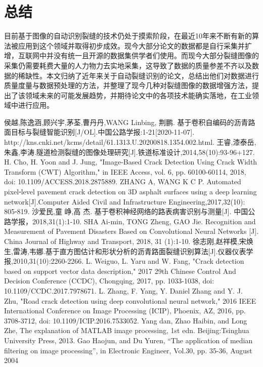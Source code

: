 \documentclass[a4paper,UTF8]{article}
\theoremstyle{definition}
\begin{document}
    \section{总结}
    目前基于图像的自动识别裂缝的技术仍处于摸索阶段，在最近10年来不断有新的算法被应用到这个领域并取得初步成效。现今大部分论文的数据都是自行采集并扩增，互联网中并没有统一且开源的数据集供学者们使用。而现今大部分裂缝图像的采集仍需要耗费大量的人力物力去实地采集，这导致了数据的质量参差不齐以及数据的稀缺性。本文归纳了近年来关于自动裂缝识别的论文，总结出他们对数据进行质量度量与数据预处理的方法，并整理了现今几种对裂缝图像的数据增强方法，提出了该领域未来的可能发展趋势，并期待论文中的各项技术能确实落地，在工业领域中进行应用。
	\begin{thebibliography}{99}
		 侯越,陈逸涵,顾兴宇,茅荃,曹丹丹,WANG Linbing, 荆鹏. 基于卷积自编码的沥青路面目标与裂缝智能识别[J/OL].中国公路学报:1-21[2020-11-07]. http://kns.cnki.net/kcms/detail/61.1313.U.20200818.1354.002.html.
		 王睿,漆泰岳,朱鑫,李涛.隧道检测裂缝的图像处理研究[J].铁道标准设计,2014,58(10):93-96+127.
		 H. Cho, H. Yoon and J. Jung, "Image-Based Crack Detection Using Crack Width Transform (CWT) Algorithm," in IEEE Access, vol. 6, pp. 60100-60114, 2018, doi: 10.1109/ACCESS.2018.2875889.
		 ZHANG A, WANG K C P. Automated pixel⁃level pavement crack detection on 3D asphalt surfaces using a deep learning network[J].Computer Aided Civil and Infrastructure Engineering,2017,32(10): 805⁃819.
		 沙爱民,童 峥,高 杰. 基于卷积神经网络的路表病害识别与测量[J]. 中国公路学报，2018,31(1):1-10. SHA Ai-min, TONG Zheng, GAO Jie. Recognition and Measurement of Pavement Disasters Based on Convolutional Neural Networks [J]. China Journal of Highway and Transport, 2018, 31 (1):1-10.
		 徐志刚,赵祥模,宋焕生,雷涛,韦娜.基于直方图估计和形状分析的沥青路面裂缝识别算法[J].仪器仪表学报,2010,31(10):2260-2266.
		 L. Weiguo, L. Yaru and W. Fang, "Crack detection based on support vector data description," 2017 29th Chinese Control And Decision Conference (CCDC), Chongqing, 2017, pp. 1033-1038, doi: 10.1109/CCDC.2017.7978671.
		 L. Zhang, F. Yang, Y. Daniel Zhang and Y. J. Zhu, "Road crack detection using deep convolutional neural network," 2016 IEEE International Conference on Image Processing (ICIP), Phoenix, AZ, 2016, pp. 3708-3712, doi: 10.1109/ICIP.2016.7533052.
		 Yang dan, Zhao Haibin, and Long Zhe, The explanation of MATLAB image processing, 1st edn. Beijing:Tsinghua University Press, 2013.
		 Gao Haojun, and Du Yuren, “The application of median filtering on image processing”, in Electronic Engineer, Vol.30, pp. 35-36, August 2004

\end{thebibliography}
\end{document}
